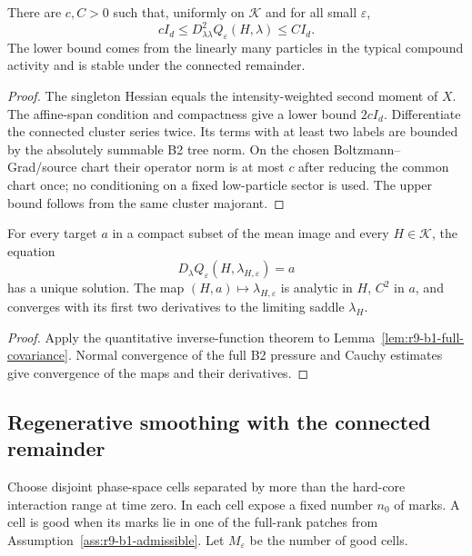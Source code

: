 \begin{lemma}
\label{lem:r9-b1-full-covariance}
There are $c,C>0$ such that, uniformly on $\mathcal K$ and for all small
$\varepsilon$,
\[
 cI_d\le D^2_{\lambda\lambda}Q_\varepsilon(H,\lambda)
 \le CI_d.
\]
The lower bound comes from the linearly many particles in the typical
compound activity and is stable under the connected remainder.
\end{lemma}

\begin{proof}
The singleton Hessian equals the intensity-weighted second moment of $X$.
The affine-span condition and compactness give a lower bound $2cI_d$.
Differentiate the connected cluster series twice.  Its terms with at least two
labels are bounded by the absolutely summable B2 tree norm.  On the chosen
Boltzmann--Grad/source chart their operator norm is at most $c$ after reducing
the common chart once; no conditioning on a fixed low-particle sector is used.
The upper bound follows from the same cluster majorant.
\end{proof}

\begin{corollary}
\label{cor:r9-b1-saddle}
For every target $a$ in a compact subset of the mean image and every
$H\in\mathcal K$, the equation
\[
 D_\lambda Q_\varepsilon(H,\lambda_{H,\varepsilon})=a
\]
has a unique solution.  The map $(H,a)\mapsto\lambda_{H,\varepsilon}$ is
analytic in $H$, $C^2$ in $a$, and converges with its first two derivatives to
the limiting saddle $\lambda_H$.
\end{corollary}

\begin{proof}
Apply the quantitative inverse-function theorem to
Lemma~\ref{lem:r9-b1-full-covariance}.  Normal convergence of the full B2
pressure and Cauchy estimates give convergence of the maps and their
derivatives.
\end{proof}

\subsection{Regenerative smoothing with the connected remainder}

Choose disjoint phase-space cells separated by more than the hard-core
interaction range at time zero.  In each cell expose a fixed number $n_0$ of
marks.  A cell is good when its marks lie in one of the full-rank patches from
Assumption~\ref{ass:r9-b1-admissible}.  Let $M_\varepsilon$ be the number of
good cells.

